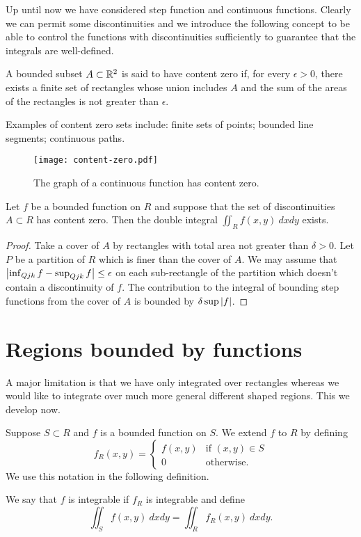 Up until now we have considered step function and continuous functions.
Clearly we can permit some discontinuities and we introduce the following concept to be able to control the functions with discontinuities sufficiently to guarantee that the integrals are well-defined.
%
\begin{definition*}
    A bounded subset \(A\subset \mathbb{R}^2\) is said to have content zero if, for every \(\epsilon>0\), there exists a finite set of rectangles whose union includes \(A\) and the sum of the areas of the rectangles is not greater than \(\epsilon\).
\end{definition*}
%
Examples of content zero sets include: finite sets of points; bounded line segments; continuous paths.

\begin{figure}
    \centering
    \texttt{[image: content-zero.pdf]}
    \caption{The graph of a continuous function has content zero.}
\end{figure}

\begin{theorem*}
    Let \(f\) be a bounded function on \(R\) and suppose that the set of discontinuities \(A\subset R\) has content zero. Then the double integral \(\iint_{R}f(x,y) \ dx dy\) exists.
\end{theorem*}
\begin{proof}
    Take a cover of \(A\) by rectangles with total area not greater than \(\delta>0\).
    Let \(P\) be a partition of \(R\) which is finer than the cover of \(A\).
    We may assume that \(\left|\inf_{Q{jk}} f - \sup_{Q{jk}} f \right|\leq \epsilon\)  on each sub-rectangle of the partition which doesn't contain a discontinuity of \(f\).
    The contribution to the integral of bounding step functions from the cover of \(A\) is bounded by \(\delta \sup \left|f\right|\).
\end{proof}

\section{Regions bounded by functions}

A major limitation is that we have only integrated over rectangles whereas we would like to integrate over much more general different shaped regions.
This we develop now.

Suppose \(S\subset R\) and \(f\) is a bounded function on \(S\).
We extend \(f\) to \(R\) by defining
\[
    f_R(x,y) = \begin{cases}
        f(x,y) & \text{if \((x,y)\in S\)} \\
        0      & \text{otherwise}.
    \end{cases}
\]
We use this notation in the following definition.
%
\begin{definition*}
    We say that \(f\) is integrable if \(f_{R}\) is integrable and define
    \[
        \iint_{S} f(x,y) \ dx dy = \iint_{R} f_{R}(x,y) \ dx dy.
    \]
\end{definition*}

